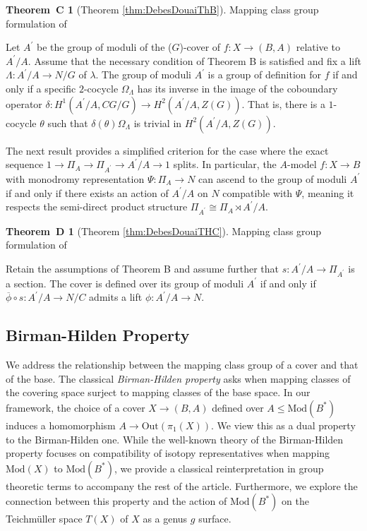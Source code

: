 \documentclass[10pt]{amsart}
\theoremstyle{definition}
\newtheorem*{thmC}{Theorem~C}
\newtheorem*{thmD}{Theorem~D}
\begin{document}
\begin{thmC}[Theorem \ref{thm:DebesDouaiThB}] Mapping class group formulation of \cite[\textit{Main Theorem} (II)]{DebesDouai97}

Let $A^\prime$ be the group of moduli of the ($G$)-cover of $f \colon X \to (B,A)$ relative to $A^\prime/A$.  Assume that the necessary condition of Theorem B is satisfied and fix a lift $\Lambda \colon A^\prime/A \to N/G$ of $\lambda$. The group of moduli $A^\prime$ is a group of definition for $f$ if and only if a specific $2$-cocycle $\Omega_\Lambda$ has its inverse in the image of the coboundary operator $\delta\colon H^1(A^\prime/A, CG/G)\to H^2(A^\prime/A,Z(G))$. That is, there is a $1$-cocycle $\theta$ such that $\delta(\theta)\Omega_\Lambda$ is trivial in $H^2(A^\prime/A,Z(G))$.
\end{thmC}

The next result provides a simplified criterion for the case where the exact sequence $1\to \Pi_A\to\Pi_{A^\prime}\to A^\prime/A\to 1$ splits. In particular, the $A$-model $f\colon X\rightarrow B$ with monodromy representation $\Psi \colon \Pi_A\rightarrow N$ can ascend to the group of moduli $A^\prime$ if and only if there  exists an action of $A^\prime/A$ on $N$ compatible with $\Psi$, meaning it respects the semi-direct product structure $\Pi_{A^\prime} \cong \Pi_A \rtimes A^\prime/A$.

\begin{thmD}[Theorem \ref{thm:DebesDouaiTHC}] Mapping class group formulation of \cite[\textit{Main Theorem} (III)]{DebesDouai97}

Retain the assumptions of Theorem B and assume further that $s\colon A^\prime/A \to \Pi_{A^\prime}$ is a section. The cover is defined over its group of moduli $A^\prime$ if and only if $\overline\phi \circ s \colon A^\prime/A \rightarrow N/C$ admits a lift $\phi:A^\prime/A\rightarrow N$.
\end{thmD}

\subsection*{Birman-Hilden Property}
We address the relationship between the mapping class group of a cover and that of the base. The classical \textit{Birman-Hilden property} asks when mapping classes of the covering space surject to mapping classes of the base space. In our framework, the choice of a cover $X \to (B,A)$ defined over $A \leq \mathrm{Mod}(B^*)$ induces a homomorphism $A \to \mathrm{Out}(\pi_1(X))$. We view this as a dual property to the Birman-Hilden one. While the well-known theory of the Birman-Hilden property focuses on compatibility of isotopy representatives when mapping $\mathrm{Mod}(X)$ to $\mathrm{Mod}(B^*)$, we provide a classical reinterpretation in group theoretic terms to accompany the rest of the article. Furthermore, we explore the connection between this property and the action of $\mathrm{Mod}(B^*)$ on the Teichmüller space $T(X)$ of $X$ as a genus $g$ surface.
\end{document}
